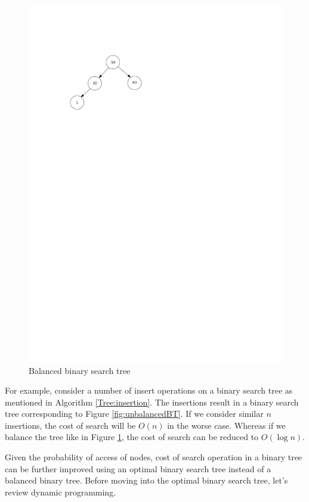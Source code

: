 \documentclass[11pt]{article}
\theoremstyle{definition}
\begin{document}
    \begin{figure}[tbh]
        \centering
        \includegraphics[scale=0.8]{figures/balancedbt.pdf}
        \caption{Balanced binary search tree}
        \label{fig:balancedBT}
    \end{figure}
    
    For example, consider a number of insert operations on a binary search tree as mentioned in Algorithm \ref{Tree:insertion}. The insertions result in a binary search tree corresponding to Figure \ref{fig:unbalancedBT}. If we consider similar $n$ insertions, the cost of search will be $O(n)$ in the worse case. Whereas if we balance the tree like in Figure \ref{fig:balancedBT}, the cost of search can be reduced to $O(\log{n})$.

    Given the probability of access of nodes, cost of search operation in a binary tree can be further improved using an optimal binary search tree instead of a balanced binary tree. Before moving into the optimal binary search tree, let's review dynamic programming.
    
\end{document}
